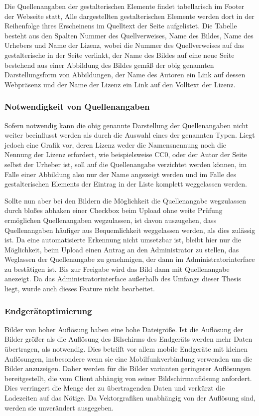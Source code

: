 Die Quellenangaben der gestalterischen Elemente findet tabellarisch im Footer der
Webseite statt, Alle dargestellten gestalterischen Elemente werden dort in der
Reihenfolge ihres Erscheinens im Quelltext der Seite aufgelistet. Die Tabelle
besteht aus den Spalten Nummer des Quellverweises, Name des Bildes,
Name des Urhebers und Name der Lizenz, wobei die Nummer des Quellverweises auf
das gestalterische in der Seite verlinkt, der Name des Bildes auf eine neue
Seite bestehend aus einer Abbildung des Bildes gemäß der obig genannten
Darstellungsform von Abbildungen, der Name des Autoren ein Link auf dessen
Webpräsenz und der Name der Lizenz ein Link auf den Volltext der Lizenz.

\subsubsection{Notwendigkeit von Quellenangaben}

Sofern notwendig kann die obig genannte Darstellung der Quellenangaben nicht
weiter beeinflusst werden als durch die Auswahl eines der genannten Typen. Liegt
jedoch eine Grafik vor, deren Lizenz weder die Namensnennung noch die Nennung
der Lizenz erfordert, wie beispielsweise CC0, oder der Autor der Seite selbst der
Urheber ist, soll auf die Quellenangabe verzichtet werden können, im Falle
einer Abbildung also nur der Name angezeigt werden und im Falle des
gestalterischen Elements der Eintrag in der Liste komplett weggelassen werden.

Sollte nun aber bei den Bildern die Möglichkeit die Quellenangabe wegzulassen
durch bloßes abhaken einer Checkbox beim Upload ohne weite Prüfung ermöglichen
Quellenangaben wegzulassen, ist davon auszugehen, dass Quellenangaben häufiger
aus Bequemlichkeit weggelassen werden, als dies zulässig ist. Da eine
automatisierte Erkennung nicht umsetzbar ist, bleibt hier nur die Möglichkeit,
beim Upload einen Antrag an den Administrator zu stellen, das Weglassen der
Quellenangabe zu genehmigen, der dann im Administratorinterface zu bestätigen
ist. Bis zur Freigabe wird das Bild dann mit Quellenangabe anezeigt. Da das
Administratorinterface außerhalb des Umfangs dieser Thesis liegt, wurde auch
dieses Feature nicht bearbeitet.

\subsubsection{Endgerätoptimierung}

Bilder von hoher Auflösung haben eine hohe Dateigröße. Ist die Auflösung der
Bilder größer als die Auflösung des Bilschirms des Endgeräts werden mehr Daten
übertragen, als notwendig. Dies betrifft vor allem mobile Endgeräte mit
kleinen Auflösungen, insbesondere wenn sie eine Mobilfunkverbindung verwenden um
die Bilder anzuzeigen. Daher werden für die Bilder varianten geringerer
Auflösungen bereitgestellt, die vom Client abhängig von seiner
Bildschirmauflösung anfordert. Dies verringert die Menge der zu übertragenden
Daten und verkürzt die Ladezeiten auf das Nötige. Da Vektorgrafiken unabhängig
von der Auflösung sind, werden sie unverändert ausgegeben.

